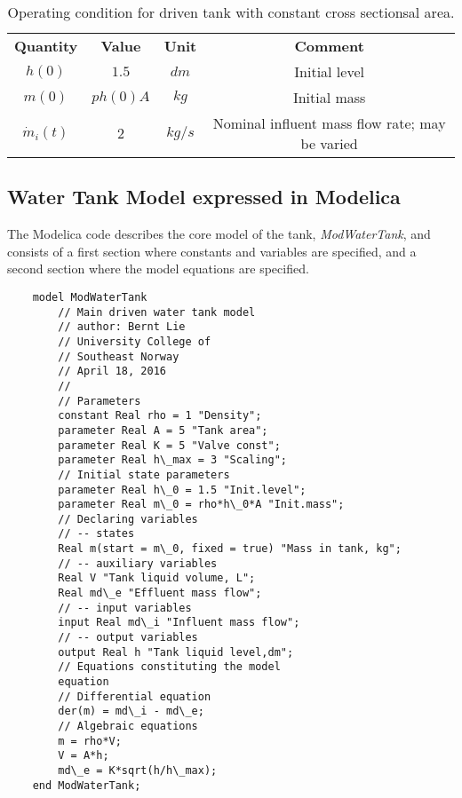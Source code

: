 \begin{table}
	\begin{center}
		\caption{Operating condition for driven tank with constant cross sectionsal area.} 
		\label{tab:tablemodeloperatingconditions} 
		\begin{tabular}{ cccc } 
			\hline
			\bfseries Quantity & \bfseries Value  & \bfseries Unit  & \bfseries Comment \\ 
			$h(0)$ & $1.5$ & $dm $ & Initial level \\ 
			$m(0)$ & $ph (0) A $ & $kg$ & Initial mass \\ 
			$\dot{m}_i (t)$ & $2$ & $kg/s$ & Nominal influent mass flow rate; may be varied \\
			\hline
		\end{tabular}
	\end{center}
\end{table}

\subsection{Water Tank Model expressed in Modelica}
\label{subsec:pythonmodleicamodel}

The Modelica code describes the core model of the tank, \textit{ModWaterTank}, and consists of a first section where
constants and variables are specified, and a second section where the model equations are specified.

\begin{lstlisting}
	model ModWaterTank 
		// Main driven water tank model 
		// author: Bernt Lie 
		// University College of 
		// Southeast Norway 
		// April 18, 2016 
		//
		// Parameters
		constant Real rho = 1 "Density";
		parameter Real A = 5 "Tank area";
		parameter Real K = 5 "Valve const";
		parameter Real h\_max = 3 "Scaling";
		// Initial state parameters
		parameter Real h\_0 = 1.5 "Init.level";
		parameter Real m\_0 = rho*h\_0*A "Init.mass";
		// Declaring variables
		// -- states
		Real m(start = m\_0, fixed = true) "Mass in tank, kg";
		// -- auxiliary variables
		Real V "Tank liquid volume, L";
		Real md\_e "Effluent mass flow";
		// -- input variables
		input Real md\_i "Influent mass flow";
		// -- output variables 
		output Real h "Tank liquid level,dm";
		// Equations constituting the model 
		equation 
		// Differential equation 
		der(m) = md\_i - md\_e; 
		// Algebraic equations 
		m = rho*V; 
		V = A*h;
		md\_e = K*sqrt(h/h\_max);
	end ModWaterTank;
\end{lstlisting}

